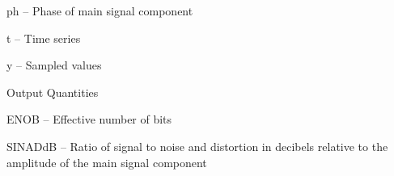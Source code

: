 \begin{tightdesc}
\begin{tightdesc}
        \item[\textsf{ph}] -- Phase of main signal component
        \item[\textsf{t}] -- Time series
        \item[\textsf{y}] -- Sampled values
    \end{tightdesc}
\item [Output Quantities] \rule{0em}{0em}
    \begin{tightdesc}
        \item[\textsf{ENOB}] -- Effective number of bits
        \item[\textsf{SINADdB}] -- Ratio of signal to noise and distortion in decibels relative to the amplitude of the main signal component
    \end{tightdesc}
\end{tightdesc}
